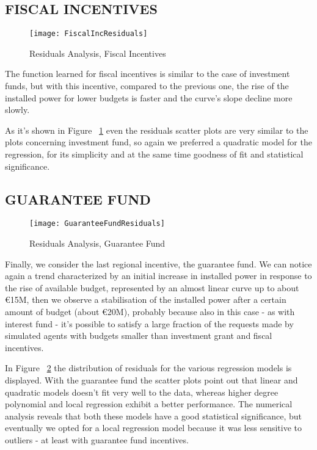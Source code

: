\documentclass [twocolumn,a4paper,10pt]{ECMS}
\newcommand{\Subsection}[1]{\subsection*{#1}\vspace*{-0.7em}}
\begin{document}
\Subsection{FISCAL INCENTIVES}

\begin{figure}[hbt]
	\centering
	\texttt{[image: FiscalIncResiduals]}
	\caption{Residuals Analysis, Fiscal Incentives}
	\label{FiscalIncResiduals}
\end{figure}

The function learned for fiscal incentives is similar to the case of investment funds, but with this incentive, compared to the previous one, the rise of the installed power for lower budgets is faster and the curve's slope decline more slowly. 

As it's shown in Figure ~\ref{FiscalIncResiduals} even the residuals scatter plots are very similar to the plots concerning investment fund, so again we preferred a quadratic model for the regression, for its simplicity and at the same time goodness of fit and statistical significance.

\Subsection{GUARANTEE FUND}

\begin{figure}[hbt]
	\centering
	\texttt{[image: GuaranteeFundResiduals]}
	\caption{Residuals Analysis, Guarantee Fund}
	\label{GuaranteeFundResiduals}
\end{figure}

Finally, we consider the last regional incentive, the guarantee fund. We can notice again a trend characterized by an initial increase in installed power in response to the rise of available budget, represented by an almost linear curve up to about \euro15M,	then we observe a stabilisation of the installed power after a certain amount of budget (about \euro20M), probably because also in this case - as with interest fund - it's possible to satisfy a large fraction of the requests made by simulated agents with budgets smaller than investment grant and fiscal incentives.

In Figure ~\ref{GuaranteeFundResiduals} the distribution of residuals for the various regression models is displayed. With the guarantee fund the scatter plots point out that linear and quadratic models doesn't fit very well to the data, whereas higher degree polynomial and local regression exhibit a better performance. The numerical analysis reveals that both these models have a good statistical significance, but eventually we opted for a local regression model because it was less sensitive to outliers - at least with guarantee fund incentives.  
\end{document}
